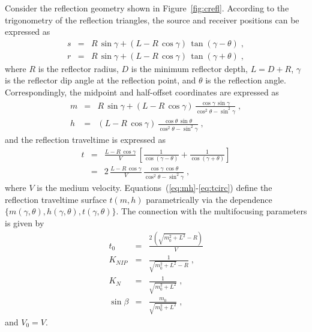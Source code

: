 Consider the reflection geometry shown in
Figure~\ref{fig:crefl}. According to the trigonometry of the
reflection triangles, the source and receiver positions can be
expressed as
\begin{eqnarray}
\label{eq:xs}
s & = & R\,\sin{\gamma} + (L - R\,\cos{\gamma})\,\tan{(\gamma-\theta)}\;, \\
\label{eq:xr}
r & = & R\,\sin{\gamma} + (L - R\,\cos{\gamma})\,\tan{(\gamma+\theta)}\;,
\end{eqnarray}
where $R$ is the reflector radius, $D$ is the minimum reflector depth, $L=D+R$,
$\gamma$ is the reflector dip angle at the reflection point, and
$\theta$ is the reflection angle. Correspondingly, the midpoint and
half-offset coordinates are expressed as
\begin{eqnarray}
\nonumber
m & = & R\,\sin{\gamma} + (L - R\,\cos{\gamma})\,\frac{\cos{\gamma}\,\sin{\gamma}}{\cos^2{\theta} - \sin^2{\gamma}}\;, \\
\label{eq:mh}
h & = & (L - R\,\cos{\gamma})\,\frac{\cos{\theta}\,\sin{\theta}}{\cos^2{\theta} - \sin^2{\gamma}}\;,
\end{eqnarray}
and the reflection traveltime is expressed as
\begin{eqnarray}
\nonumber
t & = & \frac{L - R\,\cos{\gamma}}{V}\,\left[\frac{1}{\cos{(\gamma-\theta)}} + \frac{1}{\cos{(\gamma+\theta)}}\right] \\
& = & 2\,\frac{L - R\,\cos{\gamma}}{V}\,\frac{\cos{\gamma}\,\cos{\theta}}{\cos^2{\theta} - \sin^2{\gamma}}\;,
\label{eq:tcirc}
\end{eqnarray}
where $V$ is the medium
velocity. Equations~(\ref{eq:mh}-\ref{eq:tcirc}) define the reflection
traveltime surface $t(m,h)$ parametrically via the dependence
$\{m(\gamma,\theta),h(\gamma,\theta),t(\gamma,\theta)\}$. The
connection with the multifocusing parameters is given by
\begin{eqnarray}
\label{eq:ct0} 
t_0 & = & \frac{2\,\left(\sqrt{m_0^2 + L^2}-R\right)}{V} \\
\label{eq:cknip}
K_{NIP} & = & \frac{1}{\sqrt{m_0^2 + L^2}-R}\;,   \\
\label{eq:ckn}
K_N & = & \frac{1}{\sqrt{m_0^2 + L^2}}\;,   \\
\label{eq:cbeta}
\sin{\beta} & = & \frac{m_0}{\sqrt{m_0^2 + L^2}}\;,
\end{eqnarray}
and $V_0=V$.



